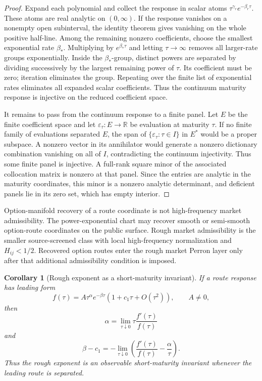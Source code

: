 \documentclass[11pt,a4paper]{amsart}
\theoremstyle{plain}
\newtheorem{corollary}[theorem]{Corollary}
\theoremstyle{definition}
\theoremstyle{remark}
\newcommand{\R}{\mathbb{R}}
\begin{document}
\begin{proof}
Expand each polynomial and collect the response in scalar atoms
\(\tau^{\gamma_r}e^{-\beta_r\tau}\).  These atoms are real analytic on \((0,\infty)\).  If the
response vanishes on a nonempty open subinterval, the identity theorem gives vanishing on the whole
positive half-line.  Among the remaining nonzero coefficients, choose the smallest exponential
rate \(\beta_\ast\).  Multiplying by \(e^{\beta_\ast\tau}\) and letting \(\tau\to\infty\) removes all
larger-rate groups exponentially.  Inside the \(\beta_\ast\)-group, distinct powers are separated by
dividing successively by the largest remaining power of \(\tau\).  Its coefficient must be zero;
iteration eliminates the group.  Repeating over the finite list of exponential rates eliminates all
expanded scalar coefficients.  Thus the continuum maturity response is injective on the reduced
coefficient space.

It remains to pass from the continuum response to a finite panel.  Let \(E\) be the finite
coefficient space and let \(\varepsilon_\tau:E\to\R\) be evaluation at maturity \(\tau\).  If no
finite family of evaluations separated \(E\), the span of \(\{\varepsilon_\tau:\tau\in I\}\) in
\(E^\ast\) would be a proper subspace.  A nonzero vector in its annihilator would generate a
nonzero dictionary combination vanishing on all of \(I\), contradicting the continuum injectivity.
Thus some finite panel is injective.  A full-rank square minor of the associated collocation matrix
is nonzero at that panel.  Since the entries are analytic in the maturity coordinates, this minor is
a nonzero analytic determinant, and deficient panels lie in its zero set, which has empty interior.
\end{proof}

Option-manifold recovery of a route coordinate is not high-frequency market admissibility.  The
power-exponential chart may recover smooth or semi-smooth option-route coordinates on the public
surface.  Rough market admissibility is the smaller source-screened class with local
high-frequency normalization and \(H_{ij}<1/2\).  Recovered option routes enter the rough market
Perron layer only after that additional admissibility condition is imposed.

\begin{corollary}[Rough exponent as a short-maturity invariant]\label{cor:rough-log-derivative}
If a route response has leading form
\[
        f(\tau)=A\tau^\alpha e^{-\beta\tau}(1+c_1\tau+O(\tau^2)),
        \qquad A\ne0,
\]
then
\[
        \alpha
        =
        \lim_{\tau\downarrow0}\tau\frac{f'(\tau)}{f(\tau)}
\]
and
\[
        \beta-c_1
        =
        -\lim_{\tau\downarrow0}
        \left(\frac{f'(\tau)}{f(\tau)}-\frac{\alpha}{\tau}\right).
\]
Thus the rough exponent is an observable short-maturity invariant whenever the leading route is
separated.
\end{corollary}
\end{document}
